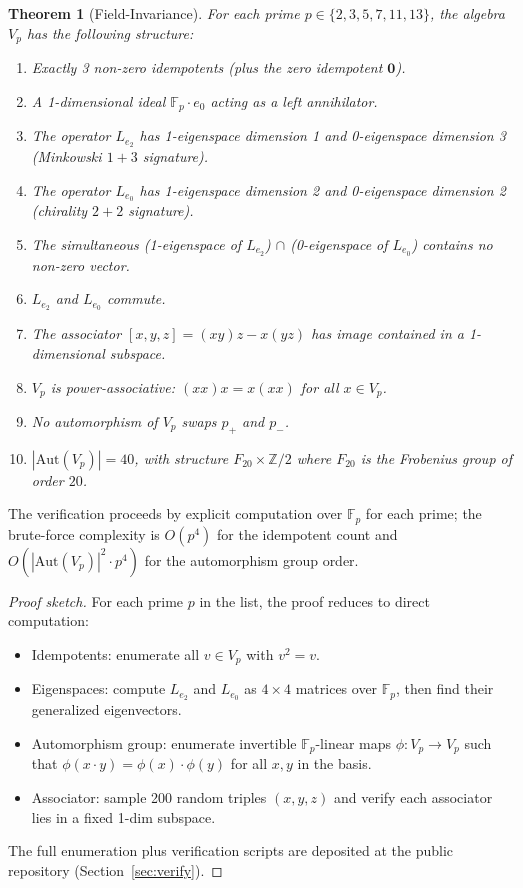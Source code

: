 \documentclass[11pt,reqno]{amsart}
\theoremstyle{plain}
\newtheorem{theorem}{Theorem}[section]
\theoremstyle{definition}
\theoremstyle{remark}
\newcommand{\Z}{\mathbb{Z}}
\newcommand{\F}{\mathbb{F}}
\newcommand{\Aut}{\mathrm{Aut}}
\begin{document}
\begin{theorem}[Field-Invariance]\label{thm:dirac-Fp}
For each prime $p \in \{2, 3, 5, 7, 11, 13\}$, the algebra $V_p$ has the
following structure:
\begin{enumerate}
\item Exactly 3 non-zero idempotents (plus the zero idempotent
$\mathbf{0}$).
\item A 1-dimensional ideal $\F_p \cdot e_0$ acting as a left
annihilator.
\item The operator $L_{e_2}$ has 1-eigenspace dimension 1 and
0-eigenspace dimension 3 (Minkowski $1{+}3$ signature).
\item The operator $L_{e_0}$ has 1-eigenspace dimension 2 and
0-eigenspace dimension 2 (chirality $2{+}2$ signature).
\item The simultaneous (1-eigenspace of $L_{e_2}$) $\cap$
(0-eigenspace of $L_{e_0}$) contains no non-zero vector.
\item $L_{e_2}$ and $L_{e_0}$ commute.
\item The associator $[x, y, z] = (xy)z - x(yz)$ has image contained in
a 1-dimensional subspace.
\item $V_p$ is power-associative: $(xx)x = x(xx)$ for all $x \in V_p$.
\item No automorphism of $V_p$ swaps $p_+$ and $p_-$.
\item $|\Aut(V_p)| = 40$, with structure $F_{20} \times \Z/2$ where
$F_{20}$ is the Frobenius group of order $20$.
\end{enumerate}
\end{theorem}

The verification proceeds by explicit computation over $\F_p$ for each
prime; the brute-force complexity is $O(p^4)$ for the idempotent count
and $O(|\Aut(V_p)|^2 \cdot p^4)$ for the automorphism group order.

\begin{proof}[Proof sketch]
For each prime $p$ in the list, the proof reduces to direct computation:
\begin{itemize}
\item Idempotents: enumerate all $v \in V_p$ with $v^2 = v$.
\item Eigenspaces: compute $L_{e_2}$ and $L_{e_0}$ as $4 \times 4$
matrices over $\F_p$, then find their generalized eigenvectors.
\item Automorphism group: enumerate invertible $\F_p$-linear maps
$\phi: V_p \to V_p$ such that $\phi(x \cdot y) = \phi(x) \cdot \phi(y)$
for all $x, y$ in the basis.
\item Associator: sample 200 random triples $(x, y, z)$ and verify each
associator lies in a fixed 1-dim subspace.
\end{itemize}
The full enumeration plus verification scripts are deposited at the
public repository (Section~\ref{sec:verify}).
\end{proof}
\end{document}
